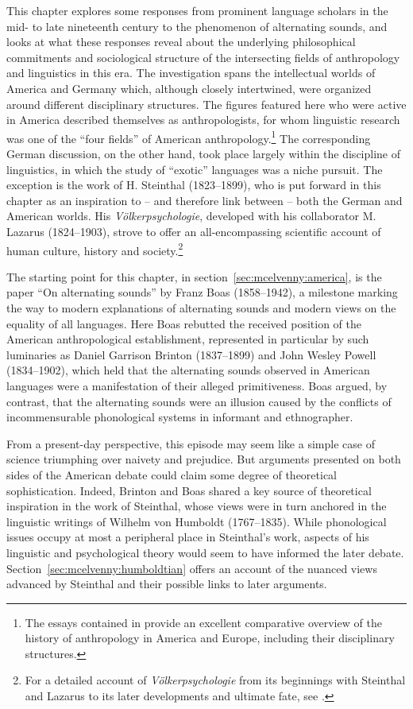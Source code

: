 \documentclass[output=paper]{langscibook}
\begin{document}
This chapter explores some responses from prominent language scholars in the mid- to late nineteenth century to the phenomenon of alternating sounds, and looks at what these responses reveal about the underlying philosophical commitments and sociological structure of the intersecting fields of anthropology and linguistics in this era. The investigation spans the intellectual worlds of America and Germany which, although closely intertwined, were organized around different disciplinary structures. The figures featured here who were active in America described themselves as anthropologists, for whom linguistic research was one of the ``four fields'' of American anthropology.\footnote{The essays contained in \citet{Kuklick2008} provide an excellent comparative overview of the history of anthropology in America and Europe, including their disciplinary structures.} The corresponding German discussion, on the other hand, took place largely within the discipline of linguistics, in which the study of ``exotic'' languages was a niche pursuit. The exception is the work of H. Steinthal (1823--1899), who is put forward in this chapter as an inspiration to -- and therefore link between -- both the German and American worlds. His \emph{Völkerpsychologie}, developed with his collaborator M. Lazarus (1824--1903), strove to offer an all-encompassing scientific account of human culture, history and society.\footnote{For a detailed account of \emph{Völkerpsychologie} from its beginnings with Steinthal and Lazarus to its later developments and ultimate fate, see \citet{Klautke2013}.}

The starting point for this chapter, in section~\ref{sec:mcelvenny:america}, is the \citeyear{Boas1889} paper ``On alternating sounds'' by Franz Boas (1858--1942), a milestone marking the way to modern explanations of alternating sounds and modern views on the equality of all languages. Here Boas rebutted the received position of the American anthropological establishment, represented in particular by such luminaries as Daniel Garrison Brinton (1837--1899) and John Wesley Powell (1834--1902), which held that the alternating sounds observed in American languages were a manifestation of their alleged primitiveness. Boas argued, by contrast, that the alternating sounds were an illusion caused by the conflicts of incommensurable phonological systems in informant and ethnographer.

From a present-day perspective, this episode may seem like a simple case of science triumphing over naivety and prejudice. But arguments presented on both sides of the American debate could claim some degree of theoretical sophistication. Indeed, Brinton and Boas shared a key source of theoretical inspiration in the work of Steinthal, whose views were in turn anchored in the linguistic writings of Wilhelm von Humboldt (1767--1835). While phonological issues occupy at most a peripheral place in Steinthal's work, aspects of his linguistic and psychological theory would seem to have informed the later debate. Section~\ref{sec:mcelvenny:humboldtian} offers an account of the nuanced views advanced by Steinthal and their possible links to later arguments.
\end{document}
